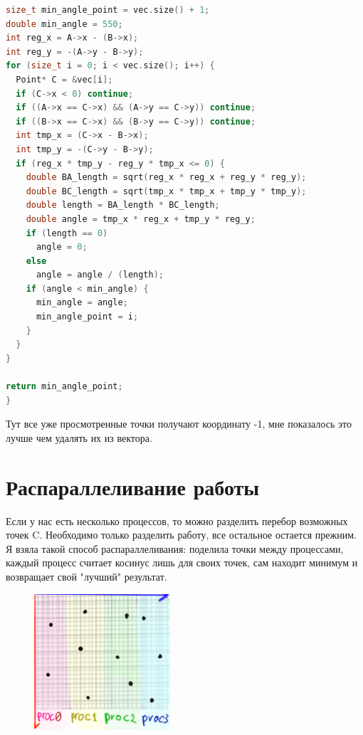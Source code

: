 \documentclass[a4paper]{article}
\begin{document}
\begin{lstlisting}[language=C++, caption=Формула нахождения минимального угла:, label=lst:example]
size_t min_angle_point = vec.size() + 1;
double min_angle = 550;
int reg_x = A->x - (B->x);
int reg_y = -(A->y - B->y); 
for (size_t i = 0; i < vec.size(); i++) {
  Point* C = &vec[i];
  if (C->x < 0) continue;
  if ((A->x == C->x) && (A->y == C->y)) continue;
  if ((B->x == C->x) && (B->y == C->y)) continue;
  int tmp_x = (C->x - B->x);
  int tmp_y = -(C->y - B->y);
  if (reg_x * tmp_y - reg_y * tmp_x <= 0) {
    double BA_length = sqrt(reg_x * reg_x + reg_y * reg_y);
    double BC_length = sqrt(tmp_x * tmp_x + tmp_y * tmp_y);
    double length = BA_length * BC_length;
    double angle = tmp_x * reg_x + tmp_y * reg_y;
    if (length == 0)
      angle = 0;
    else
      angle = angle / (length);
    if (angle < min_angle) {
      min_angle = angle;
      min_angle_point = i;
    }
  }
}

return min_angle_point;
}
\end{lstlisting}
Тут все уже просмотренные точки получают координату -1, мне показалось это лучше чем удалять их из вектора. 



\section{Распараллеливание работы}
\hspace{1cm} Если у нас есть несколько процессов, то можно разделить перебор возможных точек C. Необходимо только разделить работу, все остальное остается прежним.
Я взяла такой способ распараллеливания: поделила точки между процессами, каждый процесс считает косинус лишь для своих точек, сам находит минимум и возвращает свой "лучший" результат. 


\begin{figure}[h] %
    \centering %
    \includegraphics[width=0.45\textwidth]{image4.png} %
    \caption{} %
    \label{fig:example} %
\end{figure}
\end{document}

